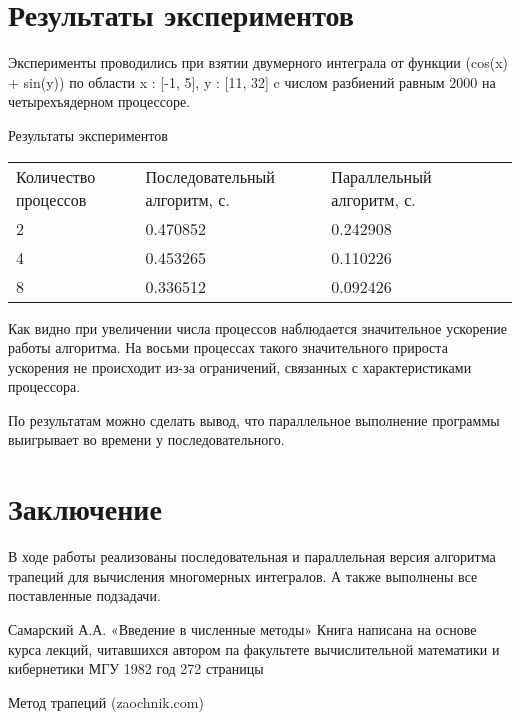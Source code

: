 \documentclass{report}
\begin{document}
	\section*{Результаты экспериментов}
	Эксперименты проводились при взятии  двумерного интеграла от функции (cos(x) + sin(y)) по области x : [-1, 5], y : [11, 32] c числом разбиений равным 2000 на четырехъядерном процессоре.   
	\begin{table}[!h]
		{Результаты экспериментов}
		\centering
		\begin{tabular}{lllll}
			Количество процессов &Последовательный алгоритм, с.  &Параллельный алгоритм, с. \\
			2        & 0.470852           & 0.242908       \\
			4        & 0.453265           & 0.110226       \\
			8       & 0.336512           & 0.092426       \\     
			
		\end{tabular}
	\end{table}
	\par Как видно при увеличении числа процессов наблюдается значительное ускорение работы алгоритма. На восьми процессах такого значительного прироста ускорения не происходит из-за ограничений, связанных с характеристиками процессора. 
	\par По результатам можно сделать вывод, что параллельное выполнение программы выигрывает во времени у последовательного.
	
	\newpage
	
	\section*{Заключение}
    В ходе работы реализованы последовательная и параллельная версия алгоритма трапеций для вычисления многомерных интегралов. А также выполнены все поставленные подзадачи. 
	\newpage
	
	\begin{thebibliography}{1}
			Самарский А.А.  
		«Введение в численные методы»  
		Книга написана на основе курса лекций, читавшихся автором па факультете вычислительной математики и кибернетики МГУ  1982 год  272 страницы 
		
		 Метод трапеций (zaochnik.com)
	\end{thebibliography}
	\newpage
	
\end{document}
